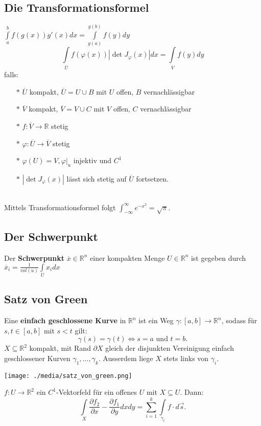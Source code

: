 \subsection{Die Transformationsformel}
    $\int\limits_a^bf(g(x))g'(x)dx=\int\limits_{g(a)}^{g(b)}f(y)dy$\\
    $$\int\limits_{\overline U}f(\varphi(x))|\det
    J_\varphi(x)|dx=\int\limits_{\overline V}f(y)dy$$
    falls:\begin{enumerate}
      \item[$*$] $\overline U$ kompakt, $\overline U=U\cup B$ mit $U$ offen, $B$
        vernachlässigbar
      \item[$*$] $\overline V$ kompakt, $\overline V=V\cup C$ mit $V$ offen, $C$
        vernachlässigbar
      \item[$*$] $f:\overline V\rightarrow\mathbb R$ stetig
      \item[$*$] $\varphi:\overline U\rightarrow\overline V$ stetig
      \item[$*$] $\varphi(U)=V, \varphi|_u$ injektiv und $C^1$
      \item[$*$] $|\det J_\varphi(x)|$ lässt sich stetig auf $\overline U$
        fortsetzen.
    \end{enumerate}\\
    Mittels Transformationsformel folgt $\int_{-\infty}^{\infty}e^{-x^2} = \sqrt{\pi}$.
    \subsection{Der Schwerpunkt}
    Der \textbf{Schwerpunkt} $\overline x\in\mathbb R^n$ einer kompakten Menge
    $U\in\mathbb R^n$ ist gegeben durch $\overline
    x_i=\frac{1}{vol(u)}\int\limits_Ux_idx$
\subsection{Satz von Green}
    Eine \textbf{einfach geschlossene Kurve} in $\mathbb R^n$ ist ein Weg
    $\gamma:[a,b]\rightarrow\mathbb R^n$, sodass für $s,t\in[a,b]$ mit $s<t$
    gilt: $$\gamma(s)=\gamma(t)\iff s=a\text{ und } t=b.$$
    $X\subseteq\mathbb R^2$ kompakt, mit Rand $\partial X$ gleich der disjunkten
    Vereinigung einfach geschlossener Kurven $\gamma_1,...,\gamma_k$. Ausserdem
    liege $X$ stets links von $\gamma_i$.
  \begin{minipage}{\linewidth}
    \texttt{[image: ./media/satz\_von\_green.png]}
  \end{minipage}
  $f:U\rightarrow\mathbb R^2$ ein $C^1$-Vektorfeld für ein offenes $U$ mit
  $X\subseteq U$. Dann: $$\int\limits_X\frac{\partial f_2}{\partial
  x}-\frac{\partial f_1}{\partial y}dxdy =
  \sum\limits_{i=1}^k\int\limits_{\gamma_i}f\cdot d\overrightarrow s.$$
  \vfil\null
